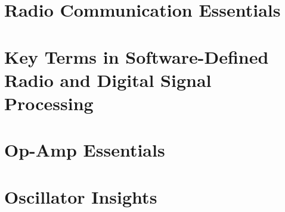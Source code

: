 \documentclass[12pt]{book}
\begin{document}
\section{Radio Communication Essentials}











\section{Key Terms in Software-Defined Radio and Digital Signal Processing}














\section{Op-Amp Essentials}












\section{Oscillator Insights}













\end{document}
